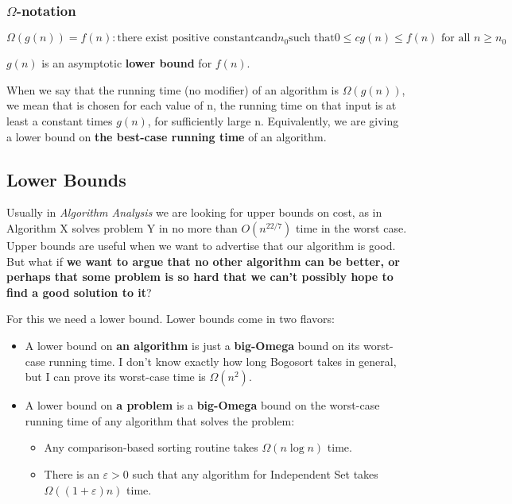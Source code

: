 \documentclass[en,hazy,blue,screen,14pt]{elegantnote}
\begin{document}
\subsubsection*{$\Omega$-notation}

\[
\Omega(g(n))={f(n):\text{there exist positive constant}c\text{and}n_{0}\text{such that}0\le cg(n)\le f(n)\text{ for all }n\ge n_{0}}
\]

$g(n)$ is an asymptotic \textbf{lower bound} for $f(n)$.

When we say that the running time (no modifier) of an algorithm is
$\Omega(g(n))$, we mean that  is chosen for each value of n, the running time on
that input is at least a constant times $g(n)$, for sufficiently
large n. Equivalently, we are giving a lower bound on \textbf{the
best-case running time} of an algorithm. 

\subsection{Lower Bounds}

Usually in \emph{Algorithm Analysis} we are looking for upper bounds
on cost, as in \textquotedbl Algorithm X solves problem Y in no more
than $O(n^{22/7})$ time in the worst case.\textquotedbl{} Upper bounds
are useful when we want to advertise that our algorithm is good. But
what if \textbf{we want to argue that no other algorithm can be better,
or perhaps that some problem is so hard that we can't possibly hope
to find a good solution to it}?

For this we need a lower bound. Lower bounds come in two flavors:
\begin{itemize}
\item A lower bound on \textbf{an algorithm} is just a \textbf{big-Omega}
bound on its worst-case running time. \textquotedbl I don't know
exactly how long Bogosort takes in general, but I can prove its worst-case
time is $\Omega(n^{2})$.\textquotedbl{}
\item A lower bound on \textbf{a problem} is a \textbf{big-Omega} bound
on the worst-case running time of any algorithm that solves the problem: 
\begin{itemize}
\item \textquotedbl Any comparison-based sorting routine takes $\Omega(n\log n)$
time.\textquotedbl{} 
\item \textquotedbl There is an $\varepsilon>0$ such that any algorithm
for Independent Set takes $\Omega((1+\varepsilon)n)$ time.\textquotedbl{} 
\end{itemize}
\end{itemize}
\end{document}
